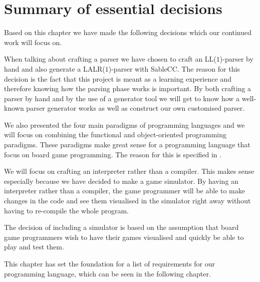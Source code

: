 \section{Summary of essential decisions}
\label{sec:summaryofdecisions}

Based on this chapter we have made the following decisions which our
continued work will focus on.

When talking about crafting a parser we have chosen to craft an
LL($1$)-parser by hand and also generate a LALR($1$)-parser with SableCC.
The reason for this decision is the fact that this project is meant as
a learning experience and therefore knowing how the parsing phase works
is important. By both crafting a parser by hand and by the use of a
generator tool we will get to know how a well-known parser generator
works as well as construct our own customised parser.

We also presented the four main paradigms of programming languages and we will 
focus on combining the functional and object-oriented programming
paradigms. These paradigms make great sense for a programming language that
focus on board game programming. The reason for this 
is specified in .

We will focus on crafting an interpreter rather than a compiler. This
makes sense especially because we have decided to make a game simulator.
By having an interpreter rather than a compiler, the game programmer will be
able to make changes in the code and see them visualised in the simulator right
away without having to re-compile the whole program.

The decision of including a simulator is based on the assumption that board game
programmers wish to have their games visualised and quickly be able to play and
test them.

This chapter has set the foundation for a list of requirements for
our programming language, which can be seen in the following chapter.
